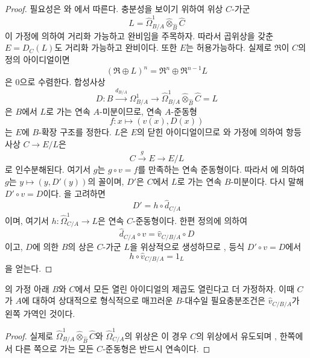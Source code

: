 \begin{proof}
필요성은 와 에서 따른다.
충분성을 보이기 위하여 위상 $C$-가군
\[
  L=\widehat{\Omega}^1_{B/A}
  \widehat\otimes_{\widehat B}\widehat C
\]
이 가정에 의하여 거리화 가능하고
완비임을 주목하자. 따라서 곱위상을 갖춘 $E=D_C(L)$도 거리화
가능하고 완비이다. 또한 $E$는 허용가능하다. 실제로
$\mathfrak R$이 $C$의 정의 아이디얼이면
\[
  (\mathfrak R\oplus L)^n
  =\mathfrak R^n\oplus\mathfrak R^{n-1}L
\]
은 $0$으로 수렴한다. 합성사상
\[
  D:B\xrightarrow{d_{B/A}}\Omega^1_{B/A}\longrightarrow
  \widehat{\Omega}^1_{B/A}
  \widehat\otimes_{\widehat B}\widehat C=L
\]
은 $B$에서 $L$로 가는 연속 $A$-미분이므로, 연속 $A$-준동형
\[
  f:x\longmapsto(v(x),D(x))
\]
는 $E$에 $B$-확장 구조를 정한다. $L$은 $E$의 닫힌 아이디얼이므로
와 가정에 의하여 항등사상 $C\to E/L$은
\[
  C\xrightarrow{g}E\longrightarrow E/L
\]
로 인수분해된다. 여기서 $g$는 $g\circ v=f$를 만족하는 연속
준동형이다. 따라서 에 의하여 $g$는
$y\mapsto(y,D'(y))$의 꼴이며, $D'$은 $C$에서 $L$로 가는 연속
$B$-미분이다. 다시 말해 $D'\circ v=D$이다.
을 고려하면
\[
  D'=h\circ\widehat d_{C/A}
\]
이며, 여기서
$h:\widehat{\Omega}^1_{C/A}\to L$은 연속 $C$-준동형이다. 한편 정의에
의하여
\[
  \widehat d_{C/A}\circ v=\widehat v_{C/B/A}\circ D
\]
이고, $D$에 의한 $B$의 상은 $C$-가군 $L$을 위상적으로 생성하므로
, 등식 $D'\circ v=D$에서
\[
  h\circ\widehat v_{C/B/A}=1_L
\]
을 얻는다.
\end{proof}

\begin{corollary}[20.7.19]
\label{0.20.7.19-ko}
의 가정 아래 $B$와 $C$에서 모든 열린 아이디얼의
제곱도 열린다고 더 가정하자. 이때 $C$가 $A$에 대하여 상대적으로
형식적으로 매끄러운 $B$-대수일 필요충분조건은
$\widehat v_{C/B/A}$가 왼쪽 가역인 것이다.
\end{corollary}

\begin{proof}
실제로
$\widehat{\Omega}^1_{B/A}\widehat\otimes_{\widehat B}\widehat C$와
$\widehat{\Omega}^1_{C/A}$의 위상은 이 경우 $C$의 위상에서 유도되며
, 한쪽에서 다른 쪽으로 가는 모든 $C$-준동형은
반드시 연속이다.
\end{proof}

